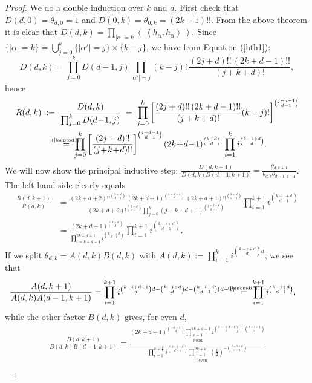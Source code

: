 \documentclass{amsart}
\newcommand{\coloneqq}{:=}
\newcommand{\bra}{\left<\!\!\!\:\left<}
\newcommand{\ket}{\right>\!\!\!\:\right>}
\newcommand{\myeq}[1]{\mathrel{\overset{\makebox[0pt]{\text{\tiny #1}}}{=}}}
\theoremstyle{plain}
\theoremstyle{definition}
\theoremstyle{remark}
\begin{document}
\begin{proof} We do a double induction over $k$ and $d$. First check that $D(d,0) = \theta_{d,0}=1$ and $D(0,k) = \theta_{0,k} =(2k-1)!!$.
From the above theorem it is clear that $D(d,k)=\prod_{|\alpha | =k}\bra h_\alpha ,h_\alpha \ket$. Since $\{ |\alpha| = k \} = \bigcup_{j=0}^k  \{ |\alpha'| = j \} \times \{ k-j \}  $, we have from Equation (\ref{hth1}):
$$
D(d,k) = \prod_{j=0}^k D(d\!-\!1,j) \prod_{|\alpha'| = j} (k-j)!\,\frac{(2j+d)!!\,(2k+d-1)!!}{(j+k+d)!},
$$
hence 
\begin{align*}
R(d,k) \;&\coloneqq\; \frac{D(d,k)}{\prod_{j=0}^k D(d\!-\!1,j) } \;=\; \prod_{j=0}^k \left[\frac{(2j+d)!!\,(2k+d-1)!!}{(j+k+d)!} (k-j)!\right]^{\binom{j+d-1}{d-1}} \\
&\qquad\myeq{(\ref{facprod1})}\; \prod_{j=0}^k\left[ \frac{(2j+d)!!}{(j\!+\!k\!+\!d)!!}\right]^{\binom{j+d-1}{d-1}}(2k\!+\!d\!-\!1)^{\binom{k+d}{d}} \;\prod_{i=1}^k i^{\binom{k-i+d}{d}} .
\end{align*}
We will now show the principal inductive step: $\frac{D(d,k+1)}{D(d,k)D(d-1,k+1)}=\frac{\theta_{d,k+1}}{\theta_{d,k}\theta_{d-1,k+1}}$. The left hand side clearly equals
\begin{align*}
 \frac{R(d,k+1)}{R(d,k)} &= \frac{(2k\!+\!d\!+\!2)!!^{\binom{k+d}{d-1}}\,(2k\!+\!d\!+\!1)^{\binom{k+d+1}{d}}\,(2k\!+\!d\!+\!1)!!^{\binom{k+d}{d-1}}}{(2k\!+\!d\!+\!2)!^{\binom{k+d}{d-1}} \prod\limits_{j=0}^k(j\!+\!k\!+\!d\!+\!1)^{\binom{j+d-1}{d-1}}} \prod_{i=1}^{k+1} i^{\binom{k-i+d}{d-1}}\\
&= \frac{(2k+d+1)^{\binom{k+d}{d}}}{\prod\limits_{i=k+d+1}^{2k+d+1}i^{ \binom{k-i+d}{d-1}} }\prod_{i=1}^{k+1} i^{\binom{k-i+d}{d-1}}.
\end{align*}
If we split $\theta_{d,k} = A(d,k)B(d,k)$ with $A(d,k)\coloneqq\prod_{i=1}^k i^{\binom{k-i+d}{d}d}$, we see that
\begin{align*}
\frac{A(d,k+1)}{A(d,k)A(d-1,k+1)} &=
 \prod_{i=1}^{k+1}i^{\binom{k-i+d+1}{d}d-\binom{k-i+d}{d}d -\binom{k-i+d}{d-1}(d-1)} \ 
 \myeq{(\ref{binomdiff})}\ \prod_{i=1}^{k+1} i^{\binom{k-i+d}{d-1}},
\end{align*}
while the other factor $B(d,k)$ gives, for even $d$,
\begin{gather*}
\frac{B(d,k+1)}{B(d,k)B(d-1,k+1)} = \frac{ (2k\!+\!d\!+\!1)^{\binom{-k-1}{d}} \prod\limits_{\substack{i=1 \\ i\ \text{odd} }}^{2k+d+1}i^{\binom{k-i+d+1}{d}-\binom{k-i+d}{d}}  }{\prod\limits_{i=1}^{k+\frac{d}{2}} i^{\binom{k-i+d}{d-1}} \prod\limits_{\substack{i=1 \\ i\ \text{even} }}^{2k+d} \left(\frac{i}{2}\right)^{- \binom{k-i+d}{d-1}} } \\

\end{gather*}
\end{proof}
\end{document}
